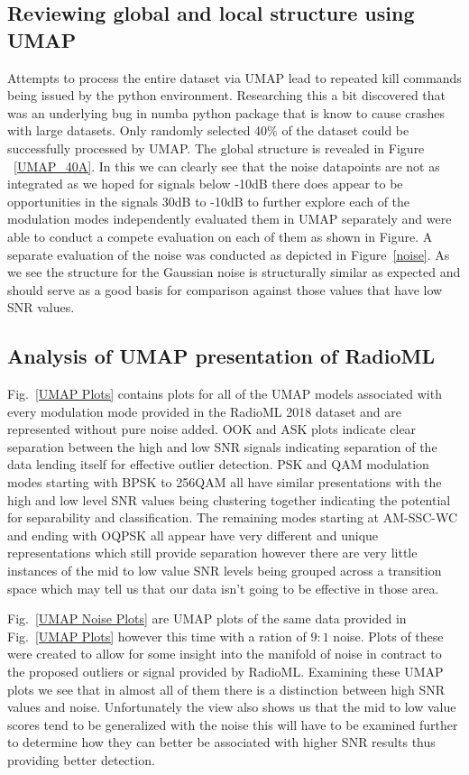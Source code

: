 \documentclass[conference]{IEEEtran}
\begin{document}
\subsection{Reviewing global and local structure using UMAP}
Attempts to process the entire dataset via UMAP lead to repeated kill commands being issued by the python environment. Researching this a bit discovered that was an underlying bug in numba python package that is know to cause crashes with large datasets. Only randomly selected 40\% of the dataset could be successfully processed by UMAP.  The global structure is revealed in Figure ~\ref{UMAP_40A}.  In this we can clearly see that the noise datapoints are not as integrated as we hoped for signals below -10dB there does appear to be opportunities in the signals 30dB to -10dB to further explore each of the modulation modes independently evaluated them in UMAP separately and were able to conduct a compete evaluation on each of them as shown in Figure.  A separate evaluation of the noise was conducted as depicted in Figure~\ref{noise}.  As we see the structure for the Gaussian noise is structurally similar as expected and should serve as a good basis for comparison against those values that have low SNR values.

\subsection{Analysis of UMAP presentation of RadioML}
Fig.~\ref{UMAP Plots} contains plots for all of the UMAP models associated with every modulation mode provided in the RadioML 2018 dataset and are represented without pure noise added.  OOK and ASK plots indicate clear separation between the high and low SNR signals indicating separation of the data lending itself for effective outlier detection. PSK and QAM modulation modes starting with BPSK to 256QAM all have similar presentations with the high and low level SNR values being clustering together indicating the potential for separability and classification.  The remaining modes starting at AM-SSC-WC and ending with OQPSK all appear have very different and unique representations which still provide separation however there are very little instances of the mid to low value SNR levels being grouped across a transition space which may tell us that our data isn't going to be effective in those area. 

Fig.~\ref{UMAP Noise Plots} are UMAP plots of the same data provided in Fig.~\ref{UMAP Plots} however this time with a ration of $9:1$ noise.  Plots of these were created to allow for some insight into the manifold of noise in contract to the proposed outliers or signal provided by RadioML.  Examining these UMAP plots we see that in almost all of them there is a distinction between high SNR values and noise.  Unfortunately the view also shows us that the mid to low value scores tend to be generalized with the noise this will have to be examined further to determine how they can better be associated with higher SNR results thus providing better detection.
\end{document}
